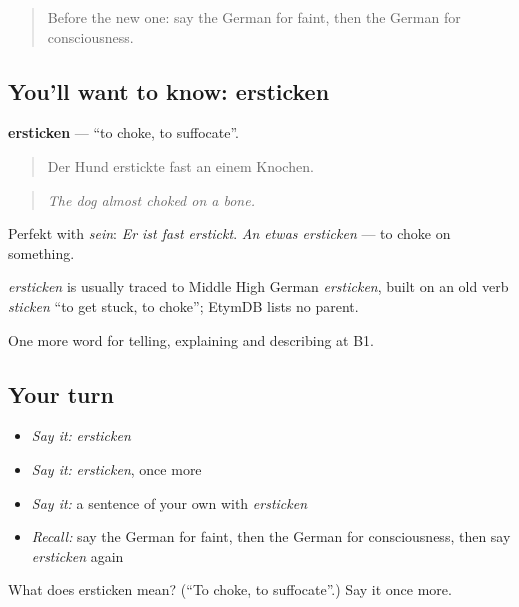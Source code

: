\begin{quote}
Before the new one: say the German for faint, then the German for consciousness.
\end{quote}

\subsection*{You'll want to know: ersticken}
\textbf{ersticken} — \textquotedblleft{}to choke, to suffocate\textquotedblright{}.

\begin{quote}
Der Hund erstickte fast an einem Knochen.
\end{quote}

\begin{quote}
\emph{The dog almost choked on a bone.}
\end{quote}

Perfekt with \emph{sein}: \emph{Er ist fast erstickt}. \emph{An etwas ersticken} — to choke on something.

\begin{cousinweb}
\emph{ersticken} is usually traced to Middle High German \emph{ersticken}, built on an old verb \emph{sticken} \textquotedblleft{}to get stuck, to choke\textquotedblright{}; EtymDB lists no parent.
\end{cousinweb}

\begin{grammarlens}[title={What you've built}]
One more word for telling, explaining and describing at B1.
\end{grammarlens}

\subsection*{Your turn}
\begin{itemize}
\raggedright
  \item \emph{Say it:} \emph{ersticken}
  \item \emph{Say it:} \emph{ersticken}, once more
  \item \emph{Say it:} a sentence of your own with \emph{ersticken}
  \item \emph{Recall:} say the German for faint, then the German for consciousness, then say \emph{ersticken} again
\end{itemize}

\begin{tcolorbox}[breakable,colback=teal!4,colframe=teal!35!black,title={Before you move on}]
What does ersticken mean? (\textquotedblleft{}To choke, to suffocate\textquotedblright{}.) Say it once more.
\end{tcolorbox}
